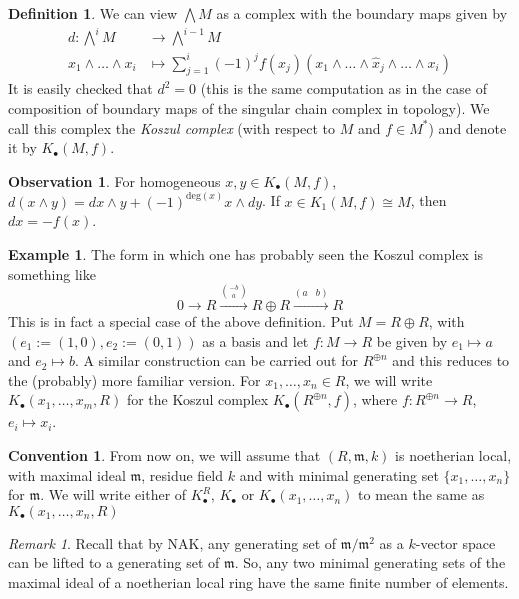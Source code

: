 \documentclass[oneside,11pt,reqno]{amsart}
\theoremstyle{definition}
\newtheorem{ex}[thm]{Example}
\newtheorem{defn}[thm]{Definition}
\newtheorem{obs}[thm]{Observation}
\newtheorem{conv}[thm]{Convention}
\theoremstyle{remark}
\newtheorem{rem}[thm]{Remark}
\begin{document}
\begin{defn}
 We can view $\bigwedge M$ as a complex with the boundary maps given by
\begin{align*}
	d: \bigwedge \nolimits^{i}M & \rightarrow \bigwedge\nolimits ^{i-1} M  \\
	x_{1}\wedge \ldots \wedge x_{i} &\mapsto \sum_{j=1}^{i} (-1)^{j}f(x_{j}) (x_{1}\wedge \ldots \wedge \hat{x}_{j} \wedge \ldots \wedge x_{i})
\end{align*}
It is easily checked that $d^{2}=0$ (this is the same computation as in the case of composition of boundary maps of the singular chain complex in topology). We call this complex the \emph{Koszul complex} (with respect to $M$ and $f\in M^{\ast}$) and denote it by $K_{\bullet}(M,f)$.
\end{defn}
\begin{obs}
 For homogeneous $x,y\in K_{\bullet}(M,f)$, $d(x\wedge y)=dx\wedge y + (-1)^{\text{deg}(x)} x \wedge dy$. If $x\in K_{1}(M,f)\cong M$, then $dx=-f(x)$.
\end{obs}
\begin{ex}
 The form in which one has probably seen the Koszul complex is something like
 \begin{equation*}
	 0 \rightarrow R \xrightarrow{\binom{-b}{a}} R\oplus R \xrightarrow{(a\;\;\;b)} R
 \end{equation*}
 This is in fact a special case of the above definition. Put $M=R \oplus R$, with $(e_{1}:=(1,0),e_{2}:=(0,1))$ as a basis and let $f:M \rightarrow R$ be given by $e_{1}\mapsto a$ and $e_{2} \mapsto b$. A similar construction can be carried out for $R^{\oplus n}$ and this reduces to the (probably) more familiar version. For $x_{1},\ldots ,x_{n}\in R$, we will write $K_{\bullet}(x_{1},\ldots ,x_{m},R)$ for the Koszul complex $K_{\bullet}(R^{\oplus n},f)$, where $f: R^{\oplus n}\rightarrow R$, $e_{i}\mapsto x_{i}$.  
\end{ex} 
\begin{conv}\label{nloc}
 From now on, we will assume that $(R,\mathfrak{m},k)$ is noetherian local, with maximal ideal $\mathfrak{m} $, residue field $k$ and with minimal generating set $\{ x_{1},\ldots ,x_{n} \} $ for $\mathfrak{m} $. We will write either of $K_{\bullet}^{R}$, $K_{\bullet}$ or $K_{\bullet }(x_{1},\ldots ,x_{n})$ to mean the same as $K_{\bullet}(x_{1},\ldots ,x_{n},R)$ 
\end{conv}

{\color{Sepia}\begin{rem}
 Recall that by NAK, any generating set of $\mathfrak{m}/\mathfrak{m}^{2}$ as a $k$-vector space can be lifted to a generating set of $\mathfrak{m} $. So, any two minimal generating sets of the maximal ideal of a noetherian local ring have the same finite number of elements.
\end{rem}}
\end{document}
